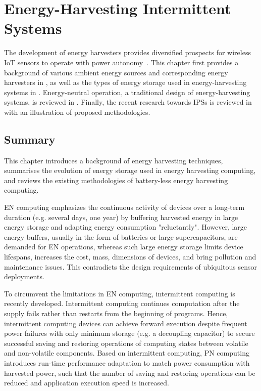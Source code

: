 \chapter{Energy-Harvesting Intermittent Systems} \label{chapter:review}

The development of energy harvesters provides diversified prospects for wireless IoT sensors to operate with power autonomy~\cite{miorandi2012internet}. 
This chapter first provides a background of various ambient energy sources and corresponding energy harvesters in , as well as the types of energy storage used in energy-harvesting systems in . 
Energy-neutral operation, a traditional design of energy-harvesting systems, is reviewed in . 
Finally, the recent research towards IPSs is reviewed in  with an illustration of proposed methodologies.






\section{Summary}

This chapter introduces a background of energy harvesting techniques, summarises the evolution of energy storage used in energy harvesting computing, and reviews the existing methodologies of battery-less energy harvesting computing. 

EN computing emphasizes the continuous activity of devices over a long-term duration (e.g. several days, one year) by buffering harvested energy in large energy storage and adapting energy consumption "reluctantly". However, large energy buffers, usually in the form of batteries or large supercapacitors, are demanded for EN operations, whereas such large energy storage limits device lifespans, increases the cost, mass, dimensions of devices, and bring pollution and maintenance issues. This contradicts the design requirements of ubiquitous sensor deployments. 

To circumvent the limitations in EN computing, intermittent computing is recently developed. Intermittent computing continues computation after the supply fails rather than restarts from the beginning of programs. Hence, intermittent computing devices can achieve forward execution despite frequent power failures with only minimum storage (e.g. a decoupling capacitor) to secure successful saving and restoring operations of computing states between volatile and non-volatile components. Based on intermittent computing, PN computing introduces run-time performance adaptation to match power consumption with harvested power, such that the number of saving and restoring operations can be reduced and application execution speed is increased. 

